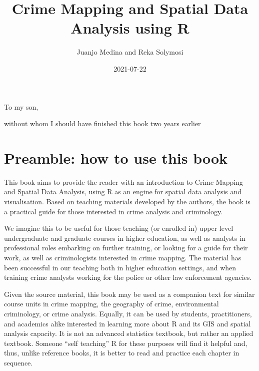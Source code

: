 \documentclass[
  krantz2]{krantz}
\title{Crime Mapping and Spatial Data Analysis using R}
\author{Juanjo Medina and Reka Solymosi}
\date{2021-07-22}
\begin{document}
\maketitle


\thispagestyle{empty}

\begin{center}
To my son,

without whom I should have finished this book two years earlier
\end{center}

\setlength{\abovedisplayskip}{-5pt}
\setlength{\abovedisplayshortskip}{-5pt}

{
\hypersetup{linkcolor=}
\setcounter{tocdepth}{2}
\tableofcontents
}
\listoftables
\listoffigures
\hypertarget{preamble-how-to-use-this-book}{%
\chapter{Preamble: how to use this book}\label{preamble-how-to-use-this-book}}

This book aims to provide the reader with an introduction to Crime Mapping and Spatial Data Analysis, using R as an engine for spatial data analysis and visualisation. Based on teaching materials developed by the authors, the book is a practical guide for those interested in crime analysis and criminology.

We imagine this to be useful for those teaching (or enrolled in) upper level undergraduate and graduate courses in higher education, as well as analysts in professional roles embarking on further training, or looking for a guide for their work, as well as criminologists interested in crime mapping. The material has been successful in our teaching both in higher education settings, and when training crime analysts working for the police or other law enforcement agencies.

Given the source material, this book may be used as a companion text for similar course units in crime mapping, the geography of crime, environmental criminology, or crime analysis. Equally, it can be used by students, practitioners, and academics alike interested in learning more about R and its GIS and spatial analysis capacity. It is not an advanced statistics textbook, but rather an applied textbook. Someone ``self teaching'' R for these purposes will find it helpful and, thus, unlike reference books, it is better to read and practice each chapter in sequence.
\end{document}
